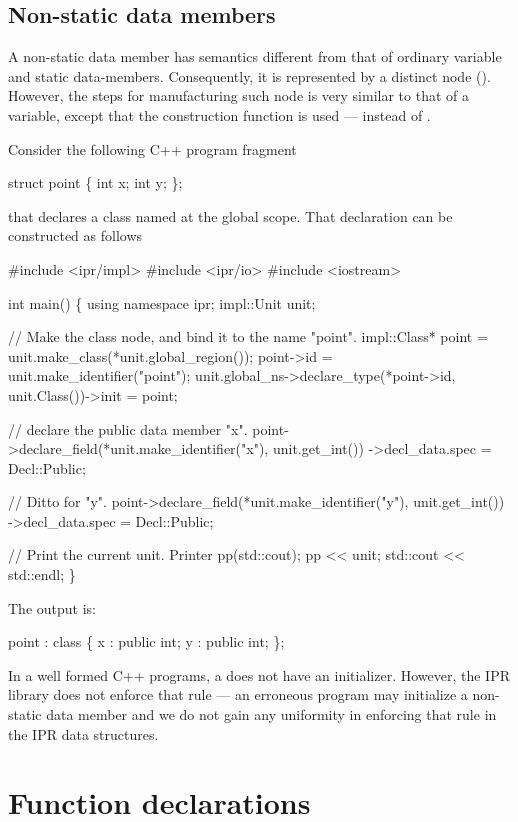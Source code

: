 \documentclass[11pt]{article}
\begin{document}
\subsection{Non-static data members}
\label{sec:named.data.nonstatic-member}

A non-static data member has semantics different from that of ordinary 
variable and static data-members.  Consequently, it is represented by a
distinct node ().  However, the steps for manufacturing such node
is very similar to that of a variable, except that the construction function 
 is used --- instead of .

Consider the following C++ program fragment
\begin{Program}
  struct point \{
    int x;
    int y;
  \};
\end{Program}
that declares a class named  at the global scope.  That
declaration can be constructed as follows
\begin{Program}
#include <ipr/impl>
#include <ipr/io>
#include <iostream>

int main()
\{
   using namespace ipr;
   impl::Unit unit;

   // Make the class node, and bind it to the name "point".
   impl::Class* point = unit.make_class(*unit.global_region());
   point->id = unit.make_identifier("point");
   unit.global_ns->declare_type(*point->id, unit.Class())->init = point;

   // declare the public data member "x".
   point->declare_field(*unit.make_identifier("x"), unit.get_int())
      ->decl_data.spec = Decl::Public;

   // Ditto for "y".
   point->declare_field(*unit.make_identifier("y"), unit.get_int())
      ->decl_data.spec = Decl::Public;

   // Print the current unit.
   Printer pp(std::cout);
   pp << unit;
   std::cout << std::endl;
\}
\end{Program}

The output is:
\begin{Program}
point : class \{
    x : public int;
    y : public int;
\};
\end{Program}
In a well formed C++ programs, a  does not have an initializer.
However, the IPR library does not enforce that rule --- an erroneous program
may initialize a non-static data member and we do not gain any uniformity in
enforcing that rule in the IPR data structures. 

\section{Function declarations}
\label{sec:fun-decl}
\end{document}
